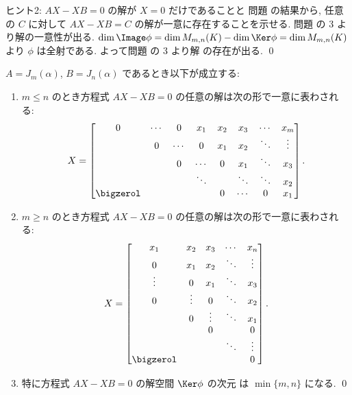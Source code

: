 \documentclass[12pt,twoside]{jarticle}
\begin{document}
\medskip
\noindent
ヒント2: $AX-XB=0$ の解が $X=0$ だけであることと
問題  の結果から, 
任意の $C$ に対して $AX-XB=C$ の解が一意に存在することを示せる.
問題  の 3 より解の一意性が出る.
$\dim\Image\phi = \dim M_{m,n}(K) - \dim\Ker\phi = \dim M_{m,n}(K)$ 
より $\phi$ は全射である.  よって問題  の 3 より解
の存在が出る.
\qed


\begin{question}
\label{q:alpha=beta:AX-XB=0}
  $A=J_m(\alpha)$, $B=J_n(\alpha)$ であるとき以下が成立する:
  \begin{enumerate}
  \item $m\le n$ のとき方程式 $AX-XB=0$ の任意の解は次の形で一意に表わされる:
    \begin{equation*}
      X = 
      \begin{bmatrix}
        0 & \cdots & 0 & x_1 & x_2 & x_3  & \cdots & x_m \\
          & 0 & \cdots & 0   & x_1 & x_2  & \ddots & \vdots \\
          &   & 0 & \cdots   & 0   & x_1  & \ddots & x_3 \\
          &   &   & \ddots   &   & \ddots & \ddots & x_2 \\
        \bigzerol & & &      & 0 & \cdots & 0      & x_1 \\
      \end{bmatrix}.
    \end{equation*}
  \item $m\ge n$ のとき方程式 $AX-XB=0$ の任意の解は次の形で一意に表わされる:
    \begin{equation*}
      X = 
      \begin{bmatrix}
        x_1    & x_2    & x_3    & \cdots & x_n \\
        0      & x_1    & x_2    & \ddots & \vdots \\
        \vdots & 0      & x_1    & \ddots & x_3 \\
        0      & \vdots & 0      & \ddots & x_2 \\
               & 0      & \vdots & \ddots & x_1 \\
               &        & 0      &        & 0 \\
               &        &        & \ddots & \vdots \\
        \bigzerol &     &        &        & 0 \\
      \end{bmatrix}.
    \end{equation*}
  \item 特に方程式 $AX-XB=0$ の解空間 $\Ker\phi$ の次元
    は $\min\{m,n\}$ になる.
    \qed
  \end{enumerate}
\end{question}
\end{document}
